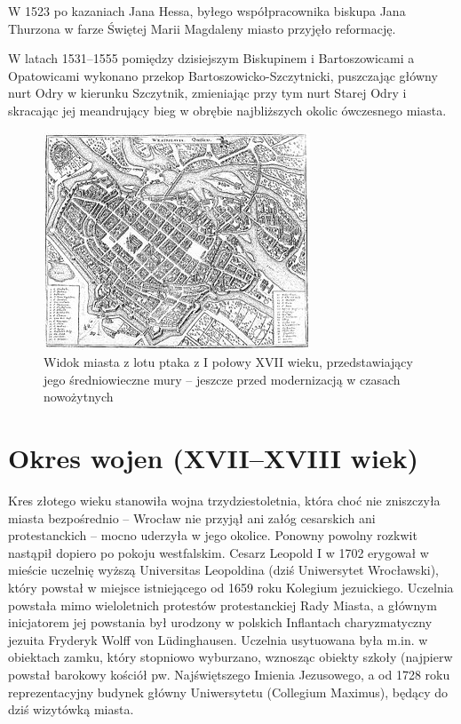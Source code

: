 \documentclass{article}
\begin{document}
W 1523 po kazaniach Jana Hessa, byłego współpracownika biskupa Jana Thurzona w farze Świętej Marii Magdaleny miasto przyjęło reformację.

W latach 1531–1555 pomiędzy dzisiejszym Biskupinem i Bartoszowicami a Opatowicami wykonano przekop Bartoszowicko-Szczytnicki, puszczając główny nurt Odry w kierunku Szczytnik, zmieniając przy tym nurt Starej Odry i skracając jej meandrujący bieg w obrębie najbliższych okolic ówczesnego miasta.

\begin{figure}[htbp!]
\centering
\includegraphics[scale=2.0]{3.jpg}
\caption{Widok miasta z lotu ptaka z I połowy XVII wieku, przedstawiający jego średniowieczne mury – jeszcze przed modernizacją w czasach nowożytnych}
\label{fig:3}
\end{figure}

\section{Okres wojen (XVII–XVIII wiek)}

Kres złotego wieku stanowiła wojna trzydziestoletnia, która choć nie zniszczyła miasta bezpośrednio – Wrocław nie przyjął ani załóg cesarskich ani protestanckich – mocno uderzyła w jego okolice. Ponowny powolny rozkwit nastąpił dopiero po pokoju westfalskim. Cesarz Leopold I w 1702 erygował w mieście uczelnię wyższą Universitas Leopoldina (dziś Uniwersytet Wrocławski), który powstał w miejsce istniejącego od 1659 roku Kolegium jezuickiego. Uczelnia powstała mimo wieloletnich protestów protestanckiej Rady Miasta, a głównym inicjatorem jej powstania był urodzony w polskich Inflantach charyzmatyczny jezuita Fryderyk Wolff von Lüdinghausen. Uczelnia usytuowana była m.in. w obiektach zamku, który stopniowo wyburzano, wznosząc obiekty szkoły (najpierw powstał barokowy kościół pw. Najświętszego Imienia Jezusowego, a od 1728 roku reprezentacyjny budynek główny Uniwersytetu (Collegium Maximus), będący do dziś wizytówką miasta.
\end{document}
